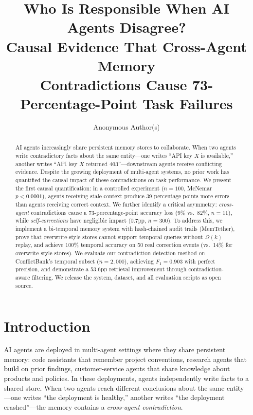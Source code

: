 \documentclass[sigconf]{acmart}
\begin{document}
\title{Who Is Responsible When AI Agents Disagree?\\Causal Evidence That Cross-Agent Memory\\Contradictions Cause 73-Percentage-Point Task Failures}

\author{Anonymous Author(s)}

\begin{abstract}
AI agents increasingly share persistent memory stores to collaborate. When two agents write contradictory facts about the same entity---one writes ``API key $X$ is available,'' another writes ``API key $X$ returned 403''---downstream agents receive conflicting evidence. Despite the growing deployment of multi-agent systems, no prior work has quantified the causal impact of these contradictions on task performance. We present the first causal quantification: in a controlled experiment ($n{=}100$, McNemar $p < 0.0001$), agents receiving stale context produce 39 percentage points more errors than agents receiving correct context. We further identify a critical asymmetry: \emph{cross-agent} contradictions cause a 73-percentage-point accuracy loss (9\% vs.\ 82\%, $n{=}11$), while \emph{self-corrections} have negligible impact (0.7pp, $n{=}300$). To address this, we implement a bi-temporal memory system with hash-chained audit trails (MemTether), prove that overwrite-style stores cannot support temporal queries without $\Omega(k)$ replay, and achieve 100\% temporal accuracy on 50 real correction events (vs.\ 14\% for overwrite-style stores). We evaluate our contradiction detection method on ConflictBank's temporal subset ($n{=}2{,}000$), achieving $F_1 = 0.903$ with perfect precision, and demonstrate a 53.6pp retrieval improvement through contradiction-aware filtering. We release the system, dataset, and all evaluation scripts as open source.
\end{abstract}

\maketitle

\section{Introduction}

AI agents are deployed in multi-agent settings where they share persistent memory: code assistants that remember project conventions, research agents that build on prior findings, customer-service agents that share knowledge about products and policies. In these deployments, agents independently write facts to a shared store. When two agents reach different conclusions about the same entity---one writes ``the deployment is healthy,'' another writes ``the deployment crashed''---the memory contains a \emph{cross-agent contradiction}.
\end{document}
